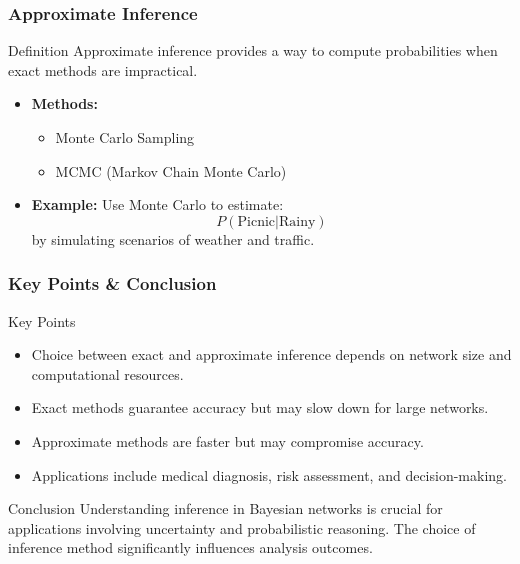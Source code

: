 \documentclass[aspectratio=169]{beamer}
\begin{document}
\begin{frame}[fragile]
    \frametitle{Approximate Inference}
    \begin{block}{Definition}
        Approximate inference provides a way to compute probabilities when exact methods are impractical.
    \end{block}
    \begin{itemize}
        \item \textbf{Methods:}
            \begin{itemize}
                \item Monte Carlo Sampling
                \item MCMC (Markov Chain Monte Carlo)
            \end{itemize}
        \item \textbf{Example:}
            Use Monte Carlo to estimate:
            \[
            P(\text{Picnic} | \text{Rainy})
            \]
            by simulating scenarios of weather and traffic.
    \end{itemize}
\end{frame}

\begin{frame}[fragile]
    \frametitle{Key Points & Conclusion}
    \begin{block}{Key Points}
        \begin{itemize}
            \item Choice between exact and approximate inference depends on network size and computational resources.
            \item Exact methods guarantee accuracy but may slow down for large networks.
            \item Approximate methods are faster but may compromise accuracy.
            \item Applications include medical diagnosis, risk assessment, and decision-making.
        \end{itemize}
    \end{block}
    
    \begin{block}{Conclusion}
        Understanding inference in Bayesian networks is crucial for applications involving uncertainty and probabilistic reasoning. The choice of inference method significantly influences analysis outcomes.
    \end{block}
\end{frame}
\end{document}

